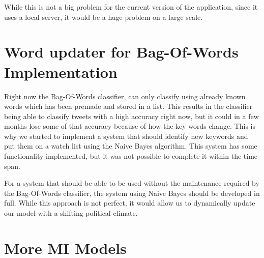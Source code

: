 While this is not a big problem for the current version of the application,
since it uses a local server, it would be a huge problem on a large scale. 

\section*{Word updater for Bag-Of-Words Implementation}
Right now the Bag-Of-Words classifier, can only classify using already known
words which has been premade and stored in a list. This results in the
classifier being able to classify tweets with a high accuracy right now, but it
could in a few months lose some of that accuracy because of how the key words
change. This is why we started to implement a system that should identify new
keywords and put them on a watch list using the Naive Bayes algorithm. This
system has some functionality implemented, but it was not possible to complete
it within the time span.

For a system that should be able to be used without the maintenance required by
the Bag-Of-Words classifier, the system using Naive Bayes should be developed in
full. While this approach is not perfect, it would allow us to dynamically
update our model with a shifting political climate.
% 

\section*{More MI  Models}

